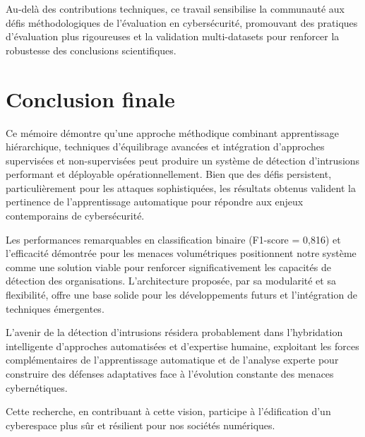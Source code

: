 Au-delà des contributions techniques, ce travail sensibilise la communauté aux défis méthodologiques de l'évaluation en cybersécurité, promouvant des pratiques d'évaluation plus rigoureuses et la validation multi-datasets pour renforcer la robustesse des conclusions scientifiques.

\section{Conclusion finale}

Ce mémoire démontre qu'une approche méthodique combinant apprentissage hiérarchique, techniques d'équilibrage avancées et intégration d'approches supervisées et non-supervisées peut produire un système de détection d'intrusions performant et déployable opérationnellement. Bien que des défis persistent, particulièrement pour les attaques sophistiquées, les résultats obtenus valident la pertinence de l'apprentissage automatique pour répondre aux enjeux contemporains de cybersécurité.

Les performances remarquables en classification binaire (F1-score = 0,816) et l'efficacité démontrée pour les menaces volumétriques positionnent notre système comme une solution viable pour renforcer significativement les capacités de détection des organisations. L'architecture proposée, par sa modularité et sa flexibilité, offre une base solide pour les développements futurs et l'intégration de techniques émergentes.

L'avenir de la détection d'intrusions résidera probablement dans l'hybridation intelligente d'approches automatisées et d'expertise humaine, exploitant les forces complémentaires de l'apprentissage automatique et de l'analyse experte pour construire des défenses adaptatives face à l'évolution constante des menaces cybernétiques.

Cette recherche, en contribuant à cette vision, participe à l'édification d'un cyberespace plus sûr et résilient pour nos sociétés numériques.

\newpage
